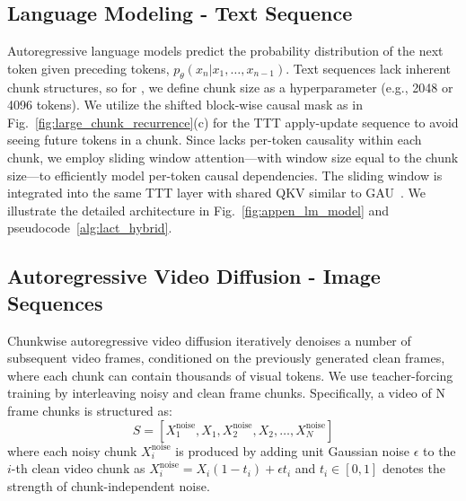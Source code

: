 \subsection{Language Modeling - Text Sequence}
\label{sec:method-lm}

 Autoregressive language models predict the probability distribution of the next token given preceding tokens, $p_{\theta}(x_n|x_1, \dots, x_{n-1})$.  Text sequences lack inherent chunk structures, so for \methodname{}, we define chunk size as a hyperparameter (e.g., 2048 or 4096 tokens).  We utilize the shifted block-wise causal mask as in Fig.~\ref{fig:large_chunk_recurrence}(c) for the TTT apply-update sequence  to avoid seeing future tokens in a chunk.
 Since \methodname{} lacks per-token causality within each chunk, we employ sliding window attention—with window size equal to the chunk size—to efficiently model per-token causal dependencies. The sliding window is integrated into the same TTT layer with shared QKV similar to GAU~\cite{hua2022transformer}. We illustrate the detailed architecture in Fig.~\ref{fig:appen_lm_model} and pseudocode~\ref{alg:lact_hybrid}.


\subsection{Autoregressive Video Diffusion - Image Sequences}

\label{sec:method-arvideo}



Chunkwise autoregressive video diffusion iteratively denoises a number of subsequent video frames, conditioned on the previously generated clean frames, where each chunk can contain thousands of visual tokens. 
We use teacher-forcing training by interleaving noisy and clean frame chunks.
Specifically, a video of N frame chunks is structured as:
\begin{equation}
    S = [X_1^{\text{noise}}, X_1, X_2^{\text{noise}}, X_2, \ldots, X_N^{\text{noise}}]
    \label{eq:video_sequence_basic}
\end{equation}
where each noisy chunk $X_i^{\text{noise}}$ is produced by adding unit Gaussian noise $\epsilon$ to the $i$-th clean video chunk as $X_i^{\text{noise}} = X_i (1 - t_i) + \epsilon t_i$ and $t_i \in [0, 1]$ denotes the strength of chunk-independent noise. 


